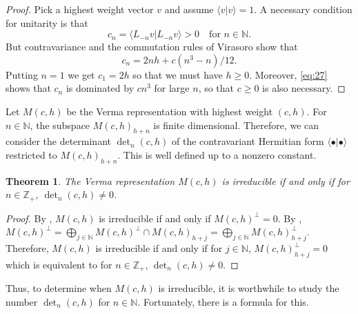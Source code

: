 \documentclass[a4paper, 12pt, reqno]{amsart}
\newtheorem{theorem}{Theorem}[section]
\theoremstyle{remark}
\numberwithin{equation}{subsection}
\begin{document}
\begin{proof}
  Pick a highest weight vector $v$ and assume $\langle v| v\rangle = 1$.
  A necessary condition for unitarity is that
  \begin{equation*}
    c_n = \langle L_{-n}v| L_{-n}v\rangle > 0 \quad \text{for }n \in \mathbb{N}.
  \end{equation*}
  But contravariance and the commutation rules of Virasoro show that
  \begin{equation}
    \label{eq:27}
    c_n = 2nh + c(n^3 - n)/12.
  \end{equation}
  Putting $n = 1$ we get $c_1 = 2h$ so that we must have $h \ge 0$.
  Moreover, \eqref{eq:27} shows that $c_n$ is dominated by $cn^3$ for large $n$, so that $c \ge 0$ is also necessary.
\end{proof}

Let $M(c, h)$ be the Verma representation with highest weight $(c, h)$.
For $n \in \mathbb{N}$, the subspace $M(c, h)_{h + n}$ is finite dimensional.
Therefore, we can consider the determinant $\det_n(c, h)$ of the contravariant Hermitian form $\langle \bullet| \bullet\rangle$ restricted to $M(c, h)_{h + n}$.
This is well defined up to a nonzero constant.

\begin{theorem}
  \label{thr:31}
  The Verma representation $M(c, h)$ is irreducible if and only if for $n \in \mathbb{Z}_+$, $\det_n(c, h) \neq 0$.
\end{theorem}

\begin{proof}
  By , $M(c, h)$ is irreducible if and only if $M(c, h)^{\perp} = 0$.
  By , $M(c, h)^{\perp} = \bigoplus_{j \in \mathbb{N}}M(c, h)^{\perp} \cap M(c, h)_{h + j} = \bigoplus_{j \in \mathbb{N}}M(c, h)_{h + j}^{\perp}$.
  Therefore, $M(c, h)$ is irreducible if and only if for $j \in \mathbb{N}$, $M(c, h)_{h + j}^{\perp} = 0$ which is equivalent to for $n \in \mathbb{Z}_+$, $\det_n(c, h) \neq 0$.
\end{proof}

Thus, to determine when $M(c, h)$ is irreducible, it is worthwhile to study the number $\det_n(c, h)$ for $n \in \mathbb{N}$.
Fortunately, there is a formula for this.
\end{document}

